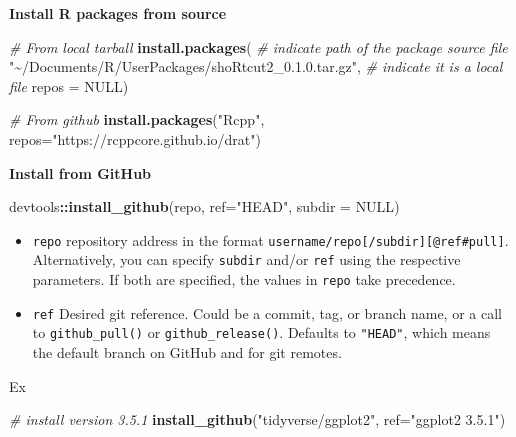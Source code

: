 \documentclass[
]{book}
\newenvironment{Shaded}{\begin{snugshade}}{\end{snugshade}}
\newcommand{\AttributeTok}[1]{\textcolor[rgb]{0.13,0.29,0.53}{#1}}
\newcommand{\CommentTok}[1]{\textcolor[rgb]{0.56,0.35,0.01}{\textit{#1}}}
\newcommand{\ConstantTok}[1]{\textcolor[rgb]{0.56,0.35,0.01}{#1}}
\newcommand{\FunctionTok}[1]{\textcolor[rgb]{0.13,0.29,0.53}{\textbf{#1}}}
\newcommand{\NormalTok}[1]{#1}
\newcommand{\SpecialCharTok}[1]{\textcolor[rgb]{0.81,0.36,0.00}{\textbf{#1}}}
\newcommand{\StringTok}[1]{\textcolor[rgb]{0.31,0.60,0.02}{#1}}
\providecommand{\tightlist}{%
  \setlength{\itemsep}{0pt}\setlength{\parskip}{0pt}}
\begin{document}
\textbf{Install R packages from source}

\begin{Shaded}
\begin{Highlighting}[]
\CommentTok{\# From local tarball}
\FunctionTok{install.packages}\NormalTok{(}
  \CommentTok{\# indicate path of the package source file}
  \StringTok{"\textasciitilde{}/Documents/R/UserPackages/shoRtcut2\_0.1.0.tar.gz"}\NormalTok{, }
  \CommentTok{\# indicate it is a local file}
  \AttributeTok{repos =} \ConstantTok{NULL}\NormalTok{)}

\CommentTok{\# From github}
\FunctionTok{install.packages}\NormalTok{(}\StringTok{"Rcpp"}\NormalTok{, }\AttributeTok{repos=}\StringTok{"https://rcppcore.github.io/drat"}\NormalTok{)}
\end{Highlighting}
\end{Shaded}

\textbf{Install from GitHub}

\begin{Shaded}
\begin{Highlighting}[]
\NormalTok{devtools}\SpecialCharTok{::}\FunctionTok{install\_github}\NormalTok{(repo, }\AttributeTok{ref=}\StringTok{"HEAD"}\NormalTok{, }\AttributeTok{subdir =} \ConstantTok{NULL}\NormalTok{)}
\end{Highlighting}
\end{Shaded}

\begin{itemize}
\tightlist
\item
  \texttt{repo} repository address in the format \texttt{username/repo{[}/subdir{]}{[}@ref\textbar{}\#pull{]}}. Alternatively, you can specify \texttt{subdir} and/or \texttt{ref} using the respective parameters. If both are specified, the values in \texttt{repo} take precedence.
\item
  \texttt{ref} Desired git reference. Could be a commit, tag, or branch name, or a call to \texttt{github\_pull()} or \texttt{github\_release()}. Defaults to \texttt{"HEAD"}, which means the default branch on GitHub and for git remotes.
\end{itemize}

Ex

\begin{Shaded}
\begin{Highlighting}[]
\CommentTok{\# install version 3.5.1}
\FunctionTok{install\_github}\NormalTok{(}\StringTok{"tidyverse/ggplot2"}\NormalTok{, }\AttributeTok{ref=}\StringTok{"ggplot2 3.5.1"}\NormalTok{)}
\end{Highlighting}
\end{Shaded}
\end{document}
